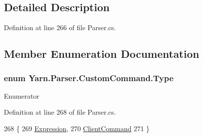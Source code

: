 \subsection{Detailed Description}


Definition at line 266 of file Parser.\-cs.



\subsection{Member Enumeration Documentation}
\hypertarget{a00085_a1d9f9f57c44e1a0d228793b658339576}{
\subsubsection[{Type}]{\setlength{\rightskip}{0pt plus 5cm}enum {\bf Yarn.\-Parser.\-Custom\-Command.\-Type}\hspace{0.3cm}{\ttfamily [package]}}}\label{a00085_a1d9f9f57c44e1a0d228793b658339576}
\begin{Desc}
\item[Enumerator]\par
\begin{description}
\item[{\em 
\hypertarget{a00085_a1d9f9f57c44e1a0d228793b658339576aa1a6657be79cc0fc1e9b23b9e108f043}{Expression}\label{a00085_a1d9f9f57c44e1a0d228793b658339576aa1a6657be79cc0fc1e9b23b9e108f043}
}]\item[{\em 
\hypertarget{a00085_a1d9f9f57c44e1a0d228793b658339576a278e9647d033d0df032a22caa7265586}{Client\-Command}\label{a00085_a1d9f9f57c44e1a0d228793b658339576a278e9647d033d0df032a22caa7265586}
}]\end{description}
\end{Desc}


Definition at line 268 of file Parser.\-cs.


\begin{DoxyCode}
268                                \{
269                 \hyperlink{a00085_a1d9f9f57c44e1a0d228793b658339576aa1a6657be79cc0fc1e9b23b9e108f043}{Expression},
270                 \hyperlink{a00085_a1d9f9f57c44e1a0d228793b658339576a278e9647d033d0df032a22caa7265586}{ClientCommand}
271             \}
\end{DoxyCode}


